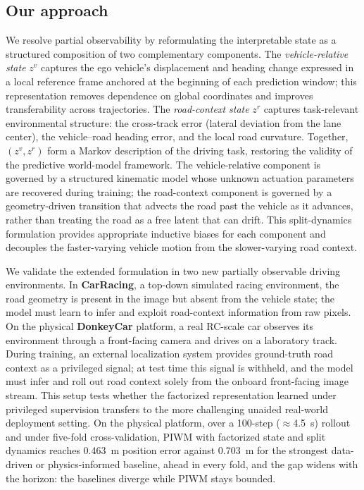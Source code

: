 \documentclass[preprint,12pt]{elsarticle}
\newcommand{\zv}{z^{v}}      %
\newcommand{\zr}{z^{r}}      %
\begin{document}
\subsection*{Our approach}

We resolve partial observability by reformulating the interpretable state as a
structured composition of two complementary components.
The \emph{vehicle-relative state} $\zv$ captures the ego vehicle's displacement
and heading change expressed in a local reference frame anchored at the beginning
of each prediction window; this representation removes dependence on global
coordinates and improves transferability across trajectories.
The \emph{road-context state} $\zr$ captures task-relevant environmental
structure: the cross-track error (lateral deviation from the lane center), the
vehicle--road heading error, and the local road curvature.
Together, $(\zv, \zr)$ form a Markov description of the driving task, restoring
the validity of the predictive world-model framework.
The vehicle-relative component is governed by a structured kinematic model whose
unknown actuation parameters are recovered during training; the road-context
component is governed by a geometry-driven transition that advects the road past
the vehicle as it advances, rather than treating the road as a free latent that
can drift.
This split-dynamics formulation provides appropriate inductive biases for each
component and decouples the faster-varying vehicle motion from the
slower-varying road context.

We validate the extended formulation in two new partially observable driving
environments.
In \textbf{CarRacing}, a top-down simulated racing environment, the road geometry
is present in the image but absent from the vehicle state; the model must learn to
infer and exploit road-context information from raw pixels.
On the physical \textbf{DonkeyCar} platform, a real RC-scale car observes its
environment through a front-facing camera and drives on a laboratory track.
During training, an external localization system provides ground-truth road
context as a privileged signal; at test time this signal is withheld, and the
model must infer and roll out road context solely from the onboard front-facing
image stream.
This setup tests whether the factorized representation learned under privileged
supervision transfers to the more challenging unaided real-world deployment
setting.
On the physical platform, over a 100-step ($\approx$\SI{4.5}{s}) rollout and under
five-fold cross-validation, PIWM with factorized state and split dynamics reaches
\SI{0.463}{m} position error against \SI{0.703}{m} for the strongest data-driven
or physics-informed baseline, ahead in every fold, and the gap widens with the
horizon: the baselines diverge while PIWM stays bounded.
\end{document}
